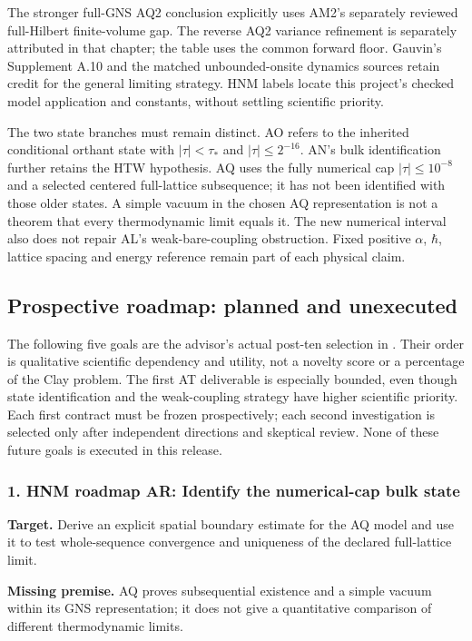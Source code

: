 The stronger full-GNS AQ2 conclusion explicitly uses AM2's separately reviewed full-Hilbert finite-volume gap. The reverse AQ2 variance refinement is separately attributed in that chapter; the table uses the common forward floor. Gauvin's Supplement A.10 and the matched unbounded-onsite dynamics sources retain credit for the general limiting strategy. HNM labels locate this project's checked model application and constants, without settling scientific priority.

The two state branches must remain distinct. AO refers to the inherited conditional orthant state with $|\tau|<\tau_*$ and $|\tau|\le2^{-16}$. AN's bulk identification further retains the HTW hypothesis. AQ uses the fully numerical cap $|\tau|\le10^{-8}$ and a selected centered full-lattice subsequence; it has not been identified with those older states. A simple vacuum in the chosen AQ representation is not a theorem that every thermodynamic limit equals it. The new numerical interval also does not repair AL's weak-bare-coupling obstruction. Fixed positive $\alpha$, $\hbar$, lattice spacing and energy reference remain part of each physical claim.

\subsection{Prospective roadmap: planned and unexecuted}
The following five goals are the advisor's actual post-ten selection in . Their order is qualitative scientific dependency and utility, not a novelty score or a percentage of the Clay problem. The first AT deliverable is especially bounded, even though state identification and the weak-coupling strategy have higher scientific priority. Each first contract must be frozen prospectively; each second investigation is selected only after independent directions and skeptical review. None of these future goals is executed in this release.
\subsubsection{1. HNM roadmap AR: Identify the numerical-cap bulk state}
\textbf{Target.} Derive an explicit spatial boundary estimate for the AQ model and use it to test whole-sequence convergence and uniqueness of the declared full-lattice limit.

\textbf{Missing premise.} AQ proves subsequential existence and a simple vacuum within its GNS representation; it does not give a quantitative comparison of different thermodynamic limits.

